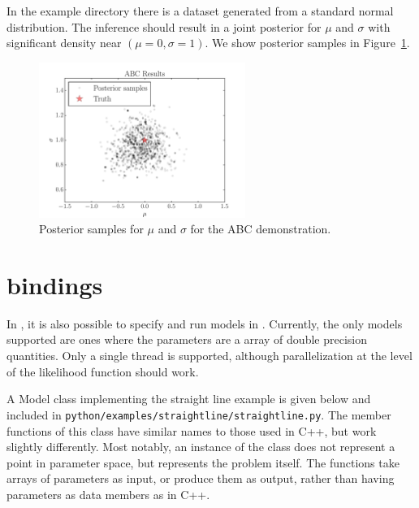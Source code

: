 \documentclass[article, nojss]{jss}
\begin{document}
In the example directory there is a dataset generated from
a standard normal distribution. The inference should
result in a joint posterior for $\mu$ and $\sigma$ with
significant density near $(\mu=0, \sigma=1)$.
We show posterior samples in Figure~\ref{fig:abc_results}.
\begin{figure}[ht!]
\centering
\includegraphics[width=0.6\textwidth]{figures/abc_results.pdf}
\caption{Posterior samples for $\mu$ and $\sigma$ for the
ABC demonstration.\label{fig:abc_results}}
\end{figure}

\section[Python bindings]{ bindings}\label{sec:python_bindings}
In , it is also possible to specify and run models in
. Currently, the only models supported
are ones where the parameters
are a  array of double precision quantities.
Only a single thread is supported, although parallelization at
the level of the  likelihood function should work.

A Model class implementing the straight line example is given below
and included in {\tt python/examples/straightline/straightline.py}.
The member functions of this class have similar names to those
used in C++, but work slightly differently. Most notably,
an instance of the class does not represent a point in parameter
space, but represents the problem itself. The functions take
 arrays of parameters as input, or produce them as
output, rather than having parameters as data members as in C++.
\end{document}
